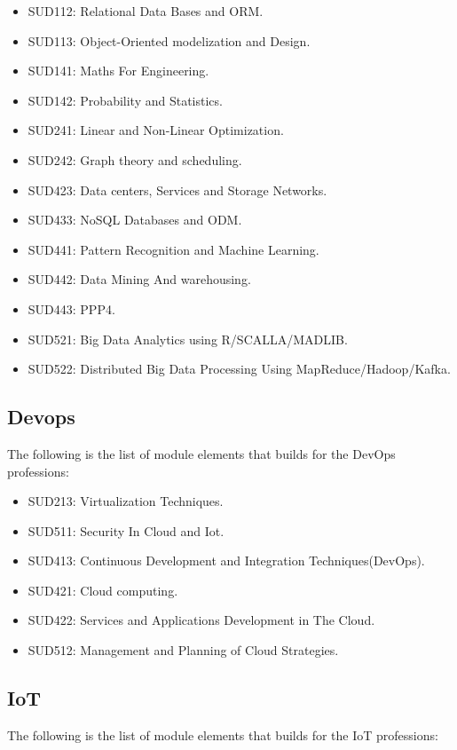 \documentclass[12pt]{extreport}
\begin{document}
\begin{itemize}

\item SUD112: Relational Data Bases and ORM.
\item SUD113: Object-Oriented modelization and Design.
\item SUD141: Maths For Engineering.
\item SUD142: Probability and Statistics.
\item SUD241: Linear and Non-Linear Optimization.
\item SUD242: Graph theory and scheduling.
\item SUD423: Data centers, Services and Storage Networks. 
\item SUD433: NoSQL Databases and ODM.
\item SUD441: Pattern Recognition and Machine Learning.
\item SUD442: Data Mining And warehousing.
\item SUD443: PPP4.
\item SUD521: Big Data Analytics using R/SCALLA/MADLIB.
\item SUD522: Distributed Big Data Processing Using MapReduce/Hadoop/Kafka.

\end{itemize}


			
\subsection{Devops}
The following is the list of module elements that builds for the DevOps professions:

\begin{itemize}
\item SUD213: Virtualization Techniques.
\item SUD511: Security In Cloud and Iot.
\item SUD413: Continuous Development and Integration Techniques(DevOps).
\item SUD421: Cloud computing.
\item SUD422: Services and Applications Development in The Cloud.
\item SUD512: Management and Planning of Cloud Strategies.

\end{itemize}

\subsection{IoT}
The following is the list of module elements that builds for the IoT professions:
\end{document}
